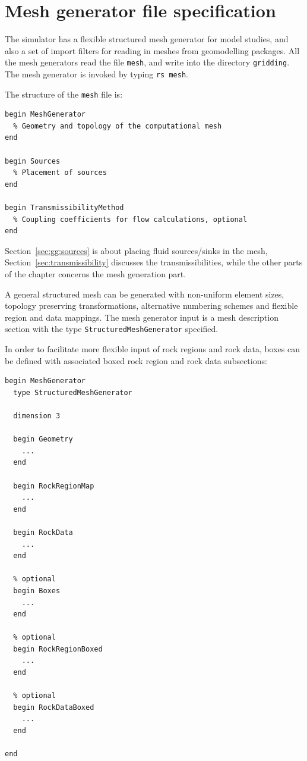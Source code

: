 \chapter{Mesh generator file specification}
\label{mesh-generators}

\minitoc

The simulator has a flexible structured mesh generator for model
studies, and also a set of import filters for reading in meshes from
geomodelling packages. All the mesh generators read the file
\texttt{mesh}, and write into the directory \texttt{gridding}. The
mesh generator is invoked by typing \texttt{rs mesh}.

The structure of the \texttt{mesh} file is:
\begin{verbatim}
begin MeshGenerator
  % Geometry and topology of the computational mesh
end

begin Sources
  % Placement of sources
end

begin TransmissibilityMethod
  % Coupling coefficients for flow calculations, optional
end
\end{verbatim}
Section~\ref{sec:gg:sources} is about placing fluid sources/sinks in
the mesh, Section~\ref{sec:transmissibility} discusses the
transmissibilities, while the other parts of the chapter concerns the
mesh generation part.


\label{sec:structured-mesh-generation}

A general structured mesh can be generated with non-uniform element
sizes, topology preserving transformations, alternative numbering
schemes and flexible region and data mappings. The mesh generator
input is a mesh description section with the type
\texttt{StructuredMeshGenerator} specified.

In order to facilitate more flexible input of rock regions and rock
data, boxes can be defined with associated boxed rock region and rock
data subsections:


\begin{verbatim}
begin MeshGenerator
  type StructuredMeshGenerator
  
  dimension 3

  begin Geometry
    ... 
  end

  begin RockRegionMap
    ... 
  end

  begin RockData
    ... 
  end

  % optional
  begin Boxes
    ... 
  end

  % optional
  begin RockRegionBoxed
    ... 
  end

  % optional
  begin RockDataBoxed
    ... 
  end

end
\end{verbatim}
%

